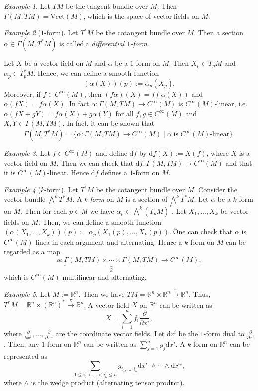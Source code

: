 \documentclass[12pt]{amsart}
\numberwithin{equation}{section}
\theoremstyle{plain}
\theoremstyle{definition}
\theoremstyle{remark}
\newtheorem{ex}{Example}[subsection]
\newcommand{\R}{\mathbb{R}}
\newcommand{\dd}{{\mathrm{d}}}
\begin{document}
\begin{ex}
Let $TM$ be the tangent bundle over $M$. Then $\Gamma(M,TM)=\mathrm{Vect}(M)$, which is the space of vector fields on $M$.
\end{ex}

\begin{ex}[$1$-form]
Let $T^*M$ be the cotangent bundle over $M$. Then a section $\alpha\in\Gamma(M,T^*M)$ is called a \emph{differential $1$-form}.
\end{ex}

Let $X$ be a vector field on $M$ and $\alpha$ be a $1$-form on $M$. Then $X_p\in T_pM$ and $\alpha_p\in T_p^*M$. Hence, we can define a smooth function 
$$(\alpha(X))(p):=\alpha_p(X_p).$$
Moreover, if $f\in C^\infty(M)$, then $(f\alpha)(X)=f(\alpha(X))$ and $\alpha(fX)=f\alpha(X)$. In fact $\alpha\colon \Gamma(M,TM)\to C^\infty(M)$ is $C^\infty(M)$-linear, i.e. $\alpha(fX+gY)=f\alpha(X)+g\alpha(Y)$ for all $f,g\in C^\infty(M)$ and $X,Y\in\Gamma(M,TM)$. In fact, it can be shown that $$\Gamma(M,T^*M)=\{\alpha\colon \Gamma(M,TM)\to C^\infty(M)\mid \text{$\alpha$ is $C^\infty(M)$-linear}\}.$$ 

\begin{ex}
Let $f\in C^\infty(M)$ and define $\dd f$ by $\dd f(X):=X(f)$, where $X$ is a vector field on $M$. Then we can check that $\dd f\colon \Gamma(M,TM)\to C^\infty(M)$ and that it is $C^\infty(M)$-linear. Hence $\dd f$ defines a $1$-form on $M$.
\end{ex}

\begin{ex}[$k$-form]
Let $T^*M$ be the cotangent bundle over $M$. Consider the vector bundle $\bigwedge^k T^*M$. A $k$-\emph{form} on $M$ is a section of $\bigwedge^k T^*M$. Let $\alpha$ be a $k$-form on $M$. Then for each $p\in M$ we have $\alpha_p\in\bigwedge^k(T_pM)^*$. Let $X_1,...,X_k$ be vector fields on $M$. Then, we can define a smooth function $(\alpha(X_1,...,X_k))(p):=\alpha_p(X_1(p),...,X_k(p))$. One can check that $\alpha$ is $C^\infty(M)$ linea in each argument and alternating. Hence a $k$-form on $M$ can be regarded as a map 
$$\alpha\colon \underbrace{\Gamma(M,TM)\times\dotsm \times \Gamma(M,TM)}_{k}\to C^\infty(M),$$
which is $C^\infty(M)$-multilinear and alternating.
\end{ex}

\begin{ex}
Let $M:=\R^n$. Then we have $TM=\R^n\times\R^n\xrightarrow{\pi}\R^n$. Thus, $T^*M=\R^n\times(\R^n)^*\xrightarrow{\pi}\R^n$. A vector field $X$ on $\R^n$ can be written as 
$$X=\sum_{i=1}^nf_i\frac{\partial}{\partial x^{i}},$$
where $\frac{\partial}{\partial x^1},...,\frac{\partial}{\partial x^n}$ are the coordinate vector fields. Let $\dd x^{i}$ be the $1$-form dual to $\frac{\partial}{\partial x^{i}}$. Then, any $1$-form on $\R^n$ can be written as $\sum_{j=1}^n g_j\dd x^{j}$. A $k$-form on $\R^n$ can be represented as 
$$\sum_{1\leq i_1<\dotsm <i_k\leq n}g_{i_1,...,i_k}\dd x^{i_1}\land\dotsm \land \dd x^{i_k},$$
where $\land$ is the wedge product (alternating tensor product).
\end{ex}
\end{document}
